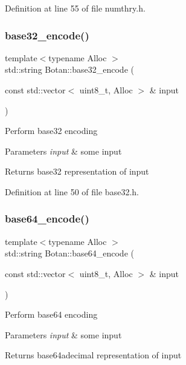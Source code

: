 Definition at line 55 of file numthry.\+h.

\mbox{\label{namespace_botan_a72149230362af50f830a4ee04d7a9786}} 
\subsubsection{\texorpdfstring{base32\+\_\+encode()}{base32\_encode()}}
{\footnotesize\ttfamily template$<$typename Alloc $>$ \\
std\+::string Botan\+::base32\+\_\+encode (\begin{DoxyParamCaption}\item[{const std\+::vector$<$ uint8\+\_\+t, Alloc $>$ \&}]{input }\end{DoxyParamCaption})}

Perform base32 encoding 
\begin{DoxyParams}{Parameters}
{\em input} & some input \\
\hline
\end{DoxyParams}
\begin{DoxyReturn}{Returns}
base32 representation of input 
\end{DoxyReturn}


Definition at line 50 of file base32.\+h.

\mbox{\label{namespace_botan_ae612d0f1287d36555adbe7ed4d8f171f}} 
\subsubsection{\texorpdfstring{base64\+\_\+encode()}{base64\_encode()}}
{\footnotesize\ttfamily template$<$typename Alloc $>$ \\
std\+::string Botan\+::base64\+\_\+encode (\begin{DoxyParamCaption}\item[{const std\+::vector$<$ uint8\+\_\+t, Alloc $>$ \&}]{input }\end{DoxyParamCaption})}

Perform base64 encoding 
\begin{DoxyParams}{Parameters}
{\em input} & some input \\
\hline
\end{DoxyParams}
\begin{DoxyReturn}{Returns}
base64adecimal representation of input 
\end{DoxyReturn}


